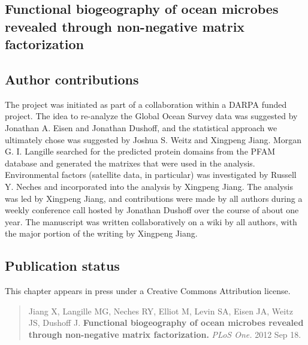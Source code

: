 \begin{refsection}
\chapter{Functional biogeography of ocean microbes revealed through non-negative matrix factorization}


\section{Author contributions}

The project was initiated as part of a collaboration within a DARPA funded project. The idea to re-analyze the Global Ocean Survey data was suggested by Jonathan A. Eisen and Jonathan Dushoff, and the statistical approach we ultimately chose was suggested by Joshua S. Weitz and Xingpeng Jiang. Morgan G. I. Langille searched for the predicted protein domains from the PFAM database and generated the matrixes that were used in the analysis. Environmental factors (satellite data, in particular) was investigated by Russell Y. Neches and incorporated into the analysis by Xingpeng Jiang. The analysis was led by Xingpeng Jiang, and contributions were made by all authors during a weekly conference call hosted by Jonathan Dushoff over the course of about one year. The manuscript was written collaboratively on a wiki by all authors, with the major portion of the writing by Xingpeng Jiang.

\section{Publication status}

This chapter appears in press under a Creative Commons Attribution
license.

\begin{quote}
Jiang X, Langille MG, Neches RY, Elliot M, Levin SA, Eisen JA, Weitz
JS, Dushoff J. {\bf Functional biogeography of ocean microbes revealed
through non-negative matrix factorization.} {\em PLoS One.} 2012 Sep
18.
\end{quote}










\printbibliography[heading=subbibliography]



\end{refsection}
